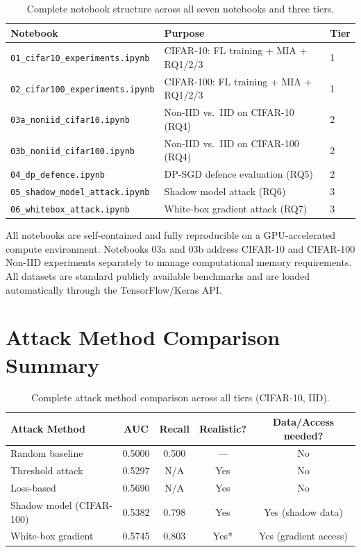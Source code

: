 \documentclass[12pt, a4paper]{report}
\begin{document}
\begin{table}[H]
  \centering
  \caption{Complete notebook structure across all seven notebooks and three tiers.}
  \begin{tabular}{lp{8cm}l}
    \toprule
    \textbf{Notebook} & \textbf{Purpose} & \textbf{Tier} \\
    \midrule
    \texttt{01\_cifar10\_experiments.ipynb}  & CIFAR-10: FL training + MIA + RQ1/2/3 & 1 \\
    \texttt{02\_cifar100\_experiments.ipynb} & CIFAR-100: FL training + MIA + RQ1/2/3 & 1 \\
    \texttt{03a\_noniid\_cifar10.ipynb}      & Non-IID vs.\ IID on CIFAR-10 (RQ4) & 2 \\
    \texttt{03b\_noniid\_cifar100.ipynb}     & Non-IID vs.\ IID on CIFAR-100 (RQ4) & 2 \\
    \texttt{04\_dp\_defence.ipynb}           & DP-SGD defence evaluation (RQ5) & 2 \\
    \texttt{05\_shadow\_model\_attack.ipynb} & Shadow model attack (RQ6) & 3 \\
    \texttt{06\_whitebox\_attack.ipynb}      & White-box gradient attack (RQ7) & 3 \\
    \bottomrule
  \end{tabular}
\end{table}

\noindent All notebooks are self-contained and fully reproducible on a
GPU-accelerated compute environment. Notebooks 03a and 03b address CIFAR-10
and CIFAR-100 Non-IID experiments separately to manage computational memory
requirements. All datasets are standard publicly available benchmarks and
are loaded automatically through the TensorFlow/Keras API.

\chapter{Attack Method Comparison Summary}
\label{app:attack_comparison}

\begin{table}[H]
  \centering
  \caption{Complete attack method comparison across all tiers (CIFAR-10, IID).}
  \begin{tabular}{lcccc}
    \toprule
    \textbf{Attack Method} & \textbf{AUC} & \textbf{Recall} & \textbf{Realistic?} & \textbf{Data/Access needed?} \\
    \midrule
    Random baseline              & 0.5000 & 0.500 & ---  & No \\
    Threshold attack             & 0.5297 & N/A   & Yes  & No \\
    Loss-based                   & 0.5690 & N/A   & Yes  & No \\
    Shadow model (CIFAR-100)     & 0.5382 & 0.798 & Yes  & Yes (shadow data) \\
    White-box gradient           & 0.5745 & 0.803 & Yes* & Yes (gradient access) \\
    \bottomrule
  \end{tabular}
\end{table}
\end{document}
